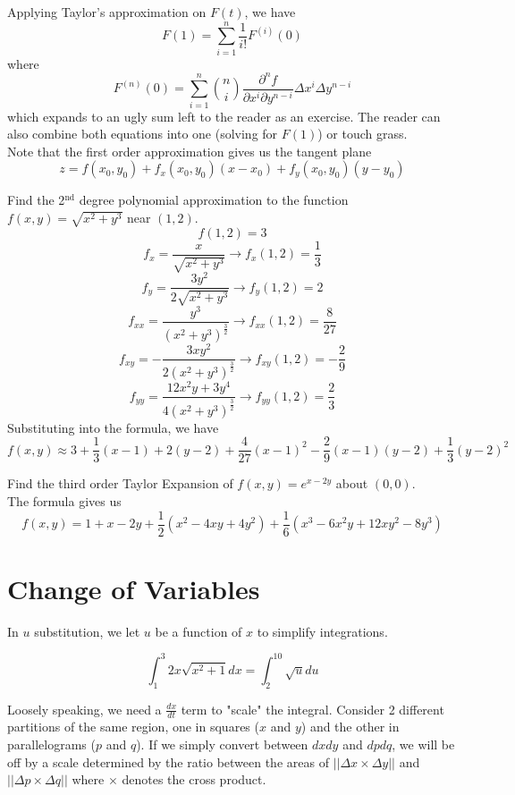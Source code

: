 \documentclass[12pt]{article}
\begin{document}
Applying Taylor's approximation on $F(t)$, we have
$$F(1) = \sum_{i=1}^n \frac{1}{i!} F^{(i)}(0)$$
where
$$F^{(n)}(0) = \sum_{i=1}^n \binom{n}{i} \frac{\partial^n f}{\partial x^i \partial y^{n-i}} \Delta x^i \Delta y^{n-i}$$
which expands to an ugly sum left to the reader as an exercise. The reader can also combine both equations into one (solving for $F(1)$) or touch grass. \\
Note that the first order approximation gives us the tangent plane
$$z = f(x_0,y_0) + f_x(x_0,y_0)(x-x_0) + f_y(x_0,y_0)(y-y_0)$$

\begin{ex}
	Find the 2$^{\text{nd}}$ degree polynomial approximation to the function $f(x,y) = \sqrt{x^2+y^3}$ near $(1,2)$.
	$$f(1,2) = 3$$
	$$f_x = \frac{x}{\sqrt{x^2+y^3}} \rightarrow f_x(1,2) = \frac{1}{3}$$
	$$f_y = \frac{3y^2}{2\sqrt{x^2+y^3}} \rightarrow f_y(1,2) = 2$$
	$$f_{xx} = \frac{y^3}{(x^2+y^3)^{\frac{3}{2}}} \rightarrow f_{xx}(1,2) = \frac{8}{27}$$
	$$f_{xy} = -\frac{3xy^2}{2(x^2+y^3)^{\frac{3}{2}}} \rightarrow f_{xy}(1,2) = -\frac{2}{9}$$
	$$f_{yy} = \frac{12x^2y + 3y^4}{4(x^2+y^3)^{\frac{3}{2}}} \rightarrow f_{yy}(1,2) = \frac{2}{3}$$
	Substituting into the formula, we have
	$$f(x,y) \approx 3 + \frac{1}{3}(x-1) + 2(y-2) + \frac{4}{27} (x-1)^2 - \frac{2}{9} (x-1)(y-2) + \frac{1}{3} (y-2)^2$$
\end{ex}

\begin{ex}
	Find the third order Taylor Expansion of $f(x,y) = e^{x-2y}$ about $(0,0)$. \\
	The formula gives us
	$$f(x,y) = 1 + x - 2y + \frac{1}{2} \left(x^2 - 4xy + 4y^2\right) + \frac{1}{6} \left(x^3 - 6x^2y + 12xy^2 - 8y^3\right)$$
\end{ex}

\section{Change of Variables}

In $u$ substitution, we let $u$ be a function of $x$ to simplify integrations.

\begin{ex}
	$$\int_1^3 2x\sqrt{x^2+1}dx = \int_2^{10} \sqrt{u} du$$
\end{ex}

Loosely speaking, we need a $\frac{dx}{dt}$ term to "scale" the integral. Consider 2 different partitions of the same region, one in squares ($x$ and $y$) and the other in parallelograms ($p$ and $q$). If we simply convert between $dxdy$ and $dpdq$, we will be off by a scale determined by the ratio between the areas of $||\Delta x \times \Delta y||$ and $||\Delta p \times \Delta q||$ where $\times$ denotes the cross product.
\end{document}
